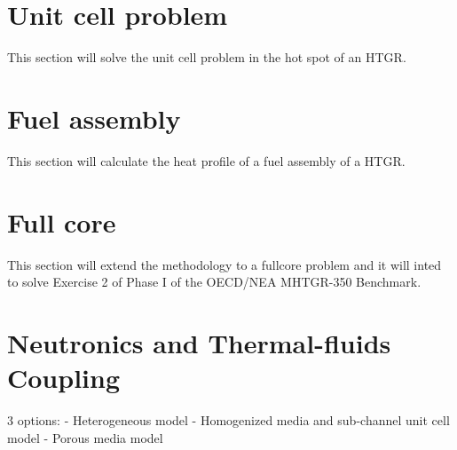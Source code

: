 \section{Unit cell problem}

This section will solve the unit cell problem in the hot spot of an HTGR.

\section{Fuel assembly}

This section will calculate the heat profile of a fuel assembly of a HTGR.

\section{Full core}

This section will extend the methodology to a fullcore problem and it will inted to solve Exercise 2 of Phase I of the OECD/NEA MHTGR-350 Benchmark.




\section{Neutronics and Thermal-fluids Coupling}

3 options:
- Heterogeneous model
- Homogenized media and sub-channel unit cell model
- Porous media model

